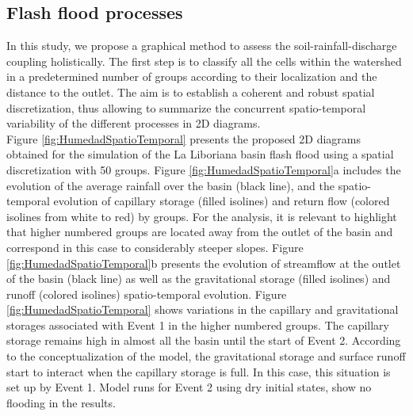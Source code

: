 \documentclass[hess, manuscript]{copernicus}
\begin{document}
\subsection{Flash flood processes}

In this study, we propose a graphical method to assess the soil-rainfall-discharge coupling holistically. The first step is to classify all the cells within the watershed in a predetermined number of groups according to their localization and the distance to the outlet. The aim is to establish a coherent and robust spatial discretization, thus allowing to summarize the concurrent spatio-temporal variability of the different processes in 2D diagrams.\\


Figure \ref{fig:HumedadSpatioTemporal} presents the proposed 2D diagrams obtained for the simulation of the La Liboriana basin flash flood using a spatial discretization with 50 groups. Figure \ref{fig:HumedadSpatioTemporal}a includes the evolution of the average rainfall over the basin (black line), and the spatio-temporal evolution of capillary storage (filled isolines) and return flow (colored isolines from white to red) by groups. For the analysis, it is relevant to highlight that higher numbered groups are located away from the outlet of the basin and correspond in this case to considerably steeper slopes. Figure \ref{fig:HumedadSpatioTemporal}b presents the evolution of streamflow at the outlet of the basin (black line) as well as the gravitational storage (filled isolines) and runoff (colored isolines) spatio-temporal evolution.  Figure \ref{fig:HumedadSpatioTemporal} shows  variations in the capillary and gravitational storages associated with Event 1 in the higher numbered groups.  The capillary storage remains high in almost all the basin until the start of Event 2.  According to the conceptualization of the model, the gravitational storage and surface runoff start to interact when the capillary storage is full. In this case, this situation is set up by Event 1.  Model runs for Event 2 using dry initial states, show no flooding in the results.\\
\end{document}
